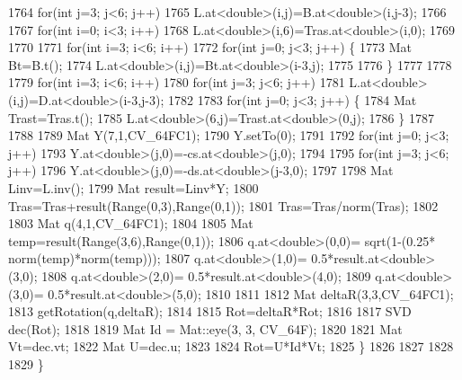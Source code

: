 \begin{DoxyCode}
1764             \textcolor{keywordflow}{for}(\textcolor{keywordtype}{int} j=3; j<6; j++)
1765                 L.at<\textcolor{keywordtype}{double}>(i,j)=B.at<\textcolor{keywordtype}{double}>(i,j-3);
1766 
1767         \textcolor{keywordflow}{for}(\textcolor{keywordtype}{int} i=0; i<3; i++)
1768             L.at<\textcolor{keywordtype}{double}>(i,6)=Tras.at<\textcolor{keywordtype}{double}>(i,0);
1769 
1770 
1771         \textcolor{keywordflow}{for}(\textcolor{keywordtype}{int} i=3; i<6; i++)
1772             \textcolor{keywordflow}{for}(\textcolor{keywordtype}{int} j=0; j<3; j++) \{
1773                 Mat Bt=B.t();
1774                 L.at<\textcolor{keywordtype}{double}>(i,j)=Bt.at<\textcolor{keywordtype}{double}>(i-3,j);
1775 
1776             \}
1777 
1778 
1779         \textcolor{keywordflow}{for}(\textcolor{keywordtype}{int} i=3; i<6; i++)
1780             \textcolor{keywordflow}{for}(\textcolor{keywordtype}{int} j=3; j<6; j++)
1781                 L.at<\textcolor{keywordtype}{double}>(i,j)=D.at<\textcolor{keywordtype}{double}>(i-3,j-3);
1782 
1783         \textcolor{keywordflow}{for}(\textcolor{keywordtype}{int} j=0; j<3; j++) \{
1784             Mat Trast=Tras.t();
1785             L.at<\textcolor{keywordtype}{double}>(6,j)=Trast.at<\textcolor{keywordtype}{double}>(0,j);
1786         \}
1787 
1788 
1789         Mat Y(7,1,CV\_64FC1);
1790         Y.setTo(0);
1791 
1792         \textcolor{keywordflow}{for}(\textcolor{keywordtype}{int} j=0; j<3; j++)
1793             Y.at<\textcolor{keywordtype}{double}>(j,0)=-cs.at<\textcolor{keywordtype}{double}>(j,0);
1794 
1795         \textcolor{keywordflow}{for}(\textcolor{keywordtype}{int} j=3; j<6; j++)
1796             Y.at<\textcolor{keywordtype}{double}>(j,0)=-ds.at<\textcolor{keywordtype}{double}>(j-3,0);
1797 
1798         Mat Linv=L.inv();
1799         Mat result=Linv*Y;
1800         Tras=Tras+result(Range(0,3),Range(0,1));
1801         Tras=Tras/norm(Tras);
1802 
1803         Mat q(4,1,CV\_64FC1);
1804 
1805         Mat temp=result(Range(3,6),Range(0,1));
1806         q.at<\textcolor{keywordtype}{double}>(0,0)= sqrt(1-(0.25* norm(temp)*norm(temp)));
1807         q.at<\textcolor{keywordtype}{double}>(1,0)= 0.5*result.at<\textcolor{keywordtype}{double}>(3,0);
1808         q.at<\textcolor{keywordtype}{double}>(2,0)= 0.5*result.at<\textcolor{keywordtype}{double}>(4,0);
1809         q.at<\textcolor{keywordtype}{double}>(3,0)= 0.5*result.at<\textcolor{keywordtype}{double}>(5,0);
1810 
1811 
1812         Mat deltaR(3,3,CV\_64FC1);
1813         getRotation(q,deltaR);
1814 
1815         Rot=deltaR*Rot;
1816 
1817         SVD dec(Rot);
1818 
1819         Mat Id = Mat::eye(3, 3, CV\_64F);
1820 
1821         Mat Vt=dec.vt;
1822         Mat U=dec.u;
1823 
1824         Rot=U*Id*Vt;
1825     \}
1826 
1827 
1828 
1829 \}
\end{DoxyCode}
\mbox{\label{classStereoCamera_a36dae897d07544e8faca8c90216173a6}} 

